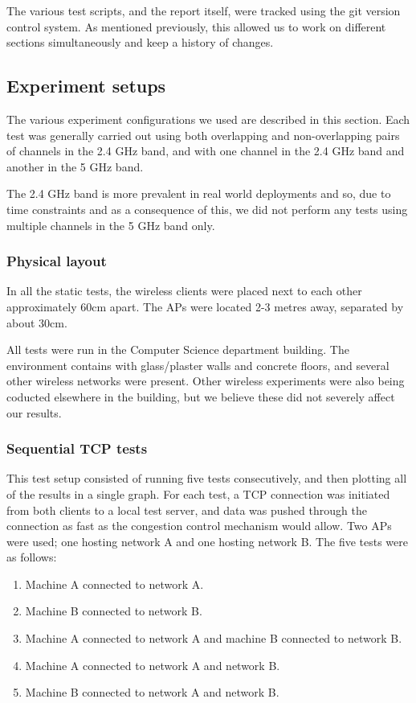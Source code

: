 The various test scripts, and the report itself, were tracked using the git
version control system. As mentioned previously,
this allowed us to work on different sections simultaneously and keep a
history of changes.

\subsection{Experiment setups}
\label{sec:met:setups}
The various experiment configurations we used are described in this section. Each
test was generally carried out using both overlapping and non-overlapping pairs of
channels in the 2.4 GHz band, and with one channel in the 2.4 GHz band and another in the
5 GHz band.

The 2.4 GHz band is more prevalent in real world deployments and so, due to
time constraints and as a consequence of this, we did not perform any tests using
multiple channels in the 5 GHz band only.

\subsubsection{Physical layout}
In all the static tests, the wireless clients were placed next to each other
approximately 60cm apart. The APs were located 2-3 metres away, separated by
about 30cm.

All tests were run in the Computer Science department building. The environment
contains with glass/plaster walls and concrete floors, and several other wireless
networks were present. Other wireless experiments were
also being coducted elsewhere in the building, but we believe these did not severely
affect our results.

\subsubsection{Sequential TCP tests}
\label{sec:met:setups:seqtcp}
This test setup consisted of running five tests consecutively, and then
plotting all of the results in a single graph. For each test, a TCP connection was
initiated from both clients to a local test server, and data was pushed through
the connection as fast as the congestion control mechanism would allow. Two
APs were used; one hosting network A and one hosting network B. The five tests
were as follows:

\begin{enumerate}
  \item Machine A connected to network A.
  \item Machine B connected to network B.
  \item Machine A connected to network A and machine B connected to network B.
  \item Machine A connected to network A and network B.
  \item Machine B connected to network A and network B.
\end{enumerate}

